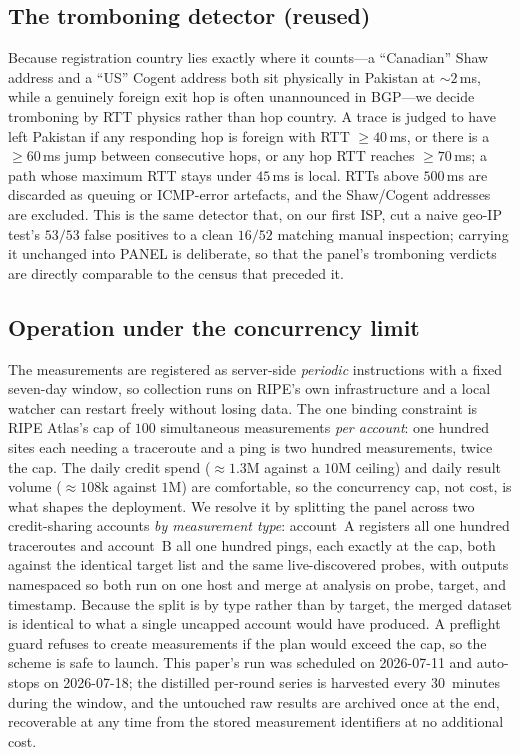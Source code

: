 \documentclass[conference]{IEEEtran}
\begin{document}
\subsection{The tromboning detector (reused)}
\label{sec:detector}
Because registration country lies exactly where it counts---a ``Canadian'' Shaw address and a
``US'' Cogent address both sit physically in Pakistan at ${\sim}2$\,ms, while a genuinely foreign
exit hop is often unannounced in BGP---we decide tromboning by RTT physics rather than hop country.
A trace is judged to have left Pakistan if any responding hop is foreign with RTT $\geq 40$\,ms, or
there is a $\geq 60$\,ms jump between consecutive hops, or any hop RTT reaches $\geq 70$\,ms; a path
whose maximum RTT stays under $45$\,ms is local. RTTs above $500$\,ms are discarded as queuing or
ICMP-error artefacts, and the Shaw/Cogent addresses are excluded. This is the same detector that, on
our first ISP, cut a naive geo-IP test's $53/53$ false positives to a clean $16/52$ matching manual
inspection; carrying it unchanged into PANEL is deliberate, so that the panel's tromboning verdicts
are directly comparable to the census that preceded it.

\subsection{Operation under the concurrency limit}
\label{sec:ops}
The measurements are registered as server-side \emph{periodic} instructions with a fixed seven-day
window, so collection runs on RIPE's own infrastructure and a local watcher can restart freely
without losing data. The one binding constraint is RIPE Atlas's cap of $100$ simultaneous
measurements \emph{per account}: one hundred sites each needing a traceroute and a ping is two
hundred measurements, twice the cap. The daily credit spend ($\approx 1.3$M against a $10$M ceiling)
and daily result volume ($\approx 108$k against $1$M) are comfortable, so the concurrency cap, not
cost, is what shapes the deployment. We resolve it by splitting the panel across two credit-sharing
accounts \emph{by measurement type}: account~A registers all one hundred traceroutes and account~B
all one hundred pings, each exactly at the cap, both against the identical target list and the same
live-discovered probes, with outputs namespaced so both run on one host and merge at analysis on
probe, target, and timestamp. Because the split is by type rather than by target, the merged dataset
is identical to what a single uncapped account would have produced. A preflight guard refuses to
create measurements if the plan would exceed the cap, so the scheme is safe to launch. This paper's
run was scheduled on 2026-07-11 and auto-stops on 2026-07-18; the distilled per-round series is
harvested every $30$~minutes during the window, and the untouched raw results are archived once at
the end, recoverable at any time from the stored measurement identifiers at no additional cost.
\end{document}
